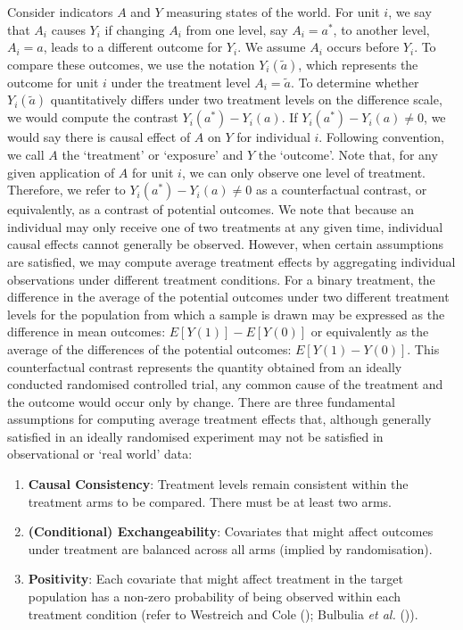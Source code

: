 \documentclass[
  single column]{article}
\providecommand{\tightlist}{%
  \setlength{\itemsep}{0pt}\setlength{\parskip}{0pt}}\usepackage{longtable,booktabs,array}
\begin{document}
Consider indicators \(A\) and \(Y\) measuring states of the world. For
unit \(i\), we say that \(A_i\) causes \(Y_i\) if changing \(A_i\) from
one level, say \(A_i = a^*\), to another level, \(A_i = a\), leads to a
different outcome for \(Y_i\). We assume \(A_i\) occurs before \(Y_i\).
To compare these outcomes, we use the notation \(Y_i(\tilde{a})\), which
represents the outcome for unit \(i\) under the treatment level
\(A_i = \tilde{a}\). To determine whether \(Y_i(\tilde{a})\)
quantitatively differs under two treatment levels on the difference
scale, we would compute the contrast \(Y_i(a^*) - Y_i(a)\). If
\(Y_i(a^*) - Y_i(a) \neq 0\), we would say there is causal effect of
\(A\) on \(Y\) for individual \(i\). Following convention, we call \(A\)
the `treatment' or `exposure' and \(Y\) the `outcome'. Note that, for
any given application of \(A\) for unit \(i\), we can only observe one
level of treatment. Therefore, we refer to \(Y_i(a^*) - Y_i(a) \neq 0\)
as a counterfactual contrast, or equivalently, as a contrast of
potential outcomes. We note that because an individual may only receive
one of two treatments at any given time, individual causal effects
cannot generally be observed. However, when certain assumptions are
satisfied, we may compute average treatment effects by aggregating
individual observations under different treatment conditions. For a
binary treatment, the difference in the average of the potential
outcomes under two different treatment levels for the population from
which a sample is drawn may be expressed as the difference in mean
outcomes: \(E[Y(1)] - E[Y(0)]\) or equivalently as the average of the
differences of the potential outcomes: \(E[Y(1) - Y(0)]\). This
counterfactual contrast represents the quantity obtained from an ideally
conducted randomised controlled trial, any common cause of the treatment
and the outcome would occur only by change. There are three fundamental
assumptions for computing average treatment effects that, although
generally satisfied in an ideally randomised experiment may not be
satisfied in observational or `real world' data:

\begin{enumerate}
\def\labelenumi{\arabic{enumi}.}
\tightlist
\item
  \textbf{Causal Consistency}: Treatment levels remain consistent within
  the treatment arms to be compared. There must be at least two arms.
\item
  \textbf{(Conditional) Exchangeability}: Covariates that might affect
  outcomes under treatment are balanced across all arms (implied by
  randomisation).
\item
  \textbf{Positivity}: Each covariate that might affect treatment in the
  target population has a non-zero probability of being observed within
  each treatment condition (refer to Westreich and Cole
  (); Bulbulia \emph{et al.}
  ()).
\end{enumerate}
\end{document}
